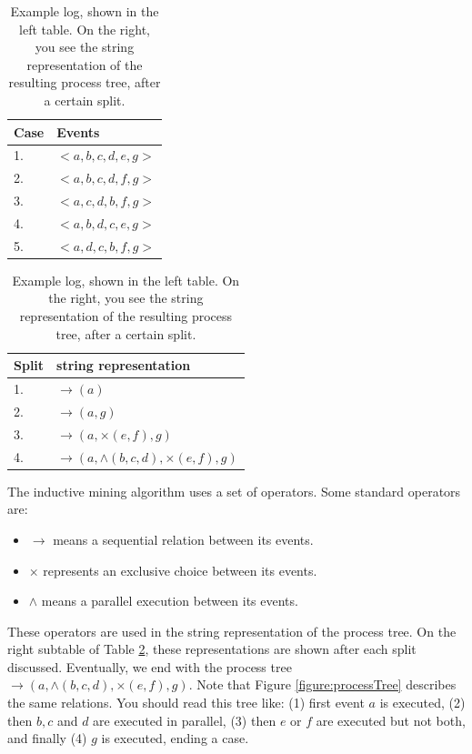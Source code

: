 \documentclass[a4paper,11pt]{article}
\begin{document}
\begin{table}[H]
\centering
\begin{tabular}{l|l}
Case & Events          \\
\hline
1.   & $<a,b,c,d,e,g>$ \\
2.   & $<a,b,c,d,f,g>$ \\
3.   & $<a,c,d,b,f,g>$ \\
4.   & $<a,b,d,c,e,g>$ \\
5.   & $<a,d,c,b,f,g>$
\end{tabular}
\quad
\begin{tabular}{l|l}
Split & string representation  \\
\hline
1.     & $\rightarrow(a)$  \\
2.     & $\rightarrow(a, g)$    \\
3.     & $\rightarrow(a, \times(e,f), g)$    \\
4.     & $\rightarrow(a, \wedge(b,c,d),\times(e,f), g)$   \\    
\end{tabular}
\caption{Example log, shown in the left table. On the right, you see the string representation of the resulting process tree, after a certain split.}
\label{table:inducExampleLog}
\end{table}

The inductive mining algorithm uses a set of operators. Some standard operators are:
\begin{itemize}
\item $\rightarrow$ means a sequential relation between its events.
\item $\times$ represents an exclusive choice between its events.
\item $\wedge$ means a parallel execution between its events.
\end{itemize}

These operators are used in the string representation of the process tree. On the right subtable of Table \ref{table:inducExampleLog}, these representations are shown after each split discussed. Eventually, we end with the process tree $\rightarrow(a, \wedge (b,c,d),\times(e,f),g)$. Note that Figure \ref{figure:processTree} describes the same relations. You should read this tree like: (1) first event $a$ is executed, (2) then $b,c$ and $d$ are executed in parallel, (3) then $e$ or $f$ are executed but not both, and finally (4) $g$ is executed, ending a case. 
\end{document}
